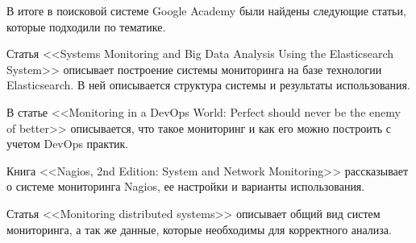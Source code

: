 В итоге в поисковой системе Google Academy были найдены следующие статьи, которые подходили по тематике.

Статья <<Systems Monitoring and Big Data Analysis Using the Elasticsearch System>> \cite{8745151} описывает построение
системы мониторинга на базе технологии Elasticsearch. В ней описывается структура системы и результаты использования.

В статье <<Monitoring in a DevOps World: Perfect should never be the enemy of better>> \cite{10.1145/3178368.3178371}
описывается, что такое мониторинг и как его можно построить с учетом DevOps практик.

Книга <<Nagios, 2nd Edition: System and Network Monitoring>> \cite{barth2008nagios} рассказывает о системе мониторинга 
Nagios, ее настройки и варианты использования.

Статья <<Monitoring distributed systems>> \cite{244791} описывает общий вид систем мониторинга, а так же данные,
которые необходимы для корректного анализа.